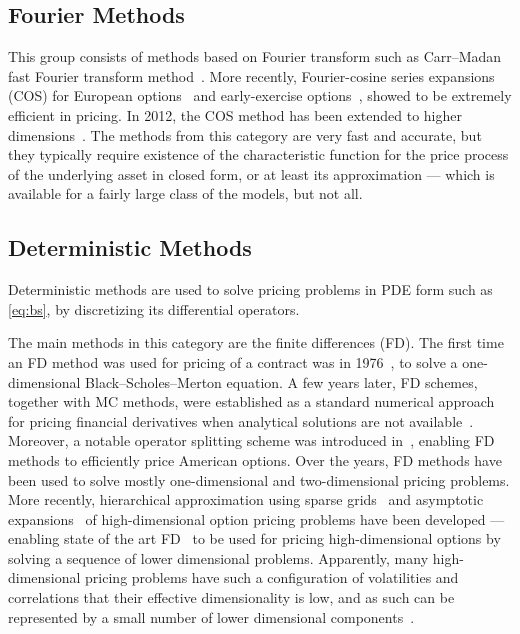 \documentclass{UUThesisTemplate}
\begin{document}
%
\subsection{Fourier Methods}

\par
This group consists of methods based on Fourier transform such as Carr--Madan fast Fourier transform method~\cite{carr1999option}. More recently, Fourier-cosine series expansions (COS) for European options~\cite{fang2008novel} and early-exercise options~\cite{fang2009pricing}, showed to be extremely efficient in pricing. In 2012, the COS method has been extended to higher dimensions~\cite{ruijter2012two}. The methods from this category are very fast and accurate, but they typically require existence of the characteristic function for the price process of the underlying asset in closed form, or at least its approximation --- which is available for a fairly large class of the models, but not all. 
%



%
\subsection{Deterministic Methods}

\par
Deterministic methods are used to solve pricing problems in PDE form such as \eqref{eq:bs}, by discretizing its differential operators. 

\par
The main methods in this category are the finite differences (FD). The first time an FD method was used for pricing of a contract was in 1976~\cite{brennan1976pricing}, to solve a one-dimensional Black--Scholes--Merton equation. A few years later, FD schemes, together with MC methods, were established as a standard numerical approach for pricing financial derivatives when analytical solutions are not available~\cite{brennan1978finite}. Moreover, a notable operator splitting scheme was introduced in~\cite{ikonen2004operator}, enabling FD methods to efficiently price American options. Over the years, FD methods have been used to solve mostly one-dimensional and two-dimensional pricing problems. More recently, hierarchical approximation using sparse grids~\cite{reisinger2007efficient} and asymptotic expansions~\cite{reisinger2015numerical} of high-dimensional option pricing problems have been developed --- enabling state of the art FD~\cite{foulon2010adi, haentjens2012adi} to be used for pricing high-dimensional options by solving a sequence of lower dimensional problems. Apparently, many high-dimensional pricing problems have such a configuration of volatilities and correlations that their effective dimensionality is low, and as such can be represented by a small number of lower dimensional components~\cite{wang2005high}.
\end{document}
